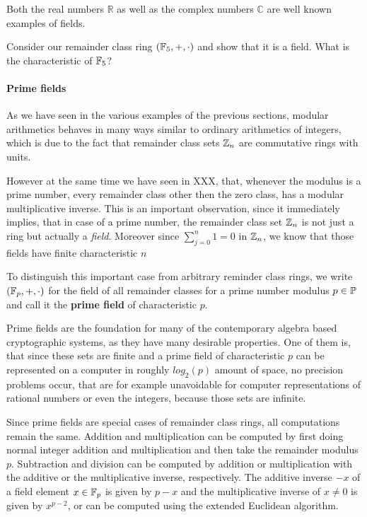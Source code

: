 \begin{example}
Both the real numbers $\mathbb{R}$ as well as the complex numbers $\mathbb{C}$ are well known examples of fields.
\end{example}
\begin{exercise}
Consider our remainder class ring $(\mathbb{F}_5,+,\cdot)$ and show that it is a field. What is the characteristic of $\mathbb{F}_5$?
\end{exercise}
\paragraph{Prime fields}
As we have seen in the various examples of the previous sections, modular arithmetics behaves in many ways similar to ordinary arithmetics of integers, which is due to the fact that remainder class sets $\mathbb{Z}_n$ are commutative rings with units.

However at the same time we have seen in XXX, that, whenever the modulus is a prime number, every remainder class other then the zero class, has a modular multiplicative inverse. This is an important observation, since it immediately implies, that in case of a prime number, the remainder class set $\mathbb{Z}_n$ is not just a ring but actually a \textit{field}. Moreover since $\sum_{j=0}^n 1 = 0$ in $\mathbb{Z}_n$, we know that those fields have finite characteristic $n$

To distinguish this important case from arbitrary reminder class rings, we write  $ (\mathbb{F}_p, +, \cdot) $ for the field of all remainder classes for a prime number modulus $p \in \mathbb{P}$ and call it the \textbf{prime field} of characteristic $p$.

Prime fields are the foundation for many of the contemporary algebra based cryptographic systems, as they have many desirable properties. One of them is, that since these sets are finite and a prime field of characteristic $p$ can be represented on a computer in roughly $log_2(p)$ amount of space, no precision problems occur, that are for example unavoidable for computer representations of rational numbers or even the integers, because those sets are infinite.

Since prime fields are special cases of remainder class rings, all computations remain the same. Addition and multiplication can be computed by first doing normal integer addition and multiplication and then take the remainder modulus $p$. Subtraction and division can be computed by addition or multiplication with the additive or the multiplicative inverse, respectively. The additive inverse $-x$ of a field element $x\in\mathbb{F}_p$ is given by $p-x$ and the multiplicative inverse of $x\neq 0$ is given by $x^{p-2}$, or can be computed using the extended Euclidean algorithm.

